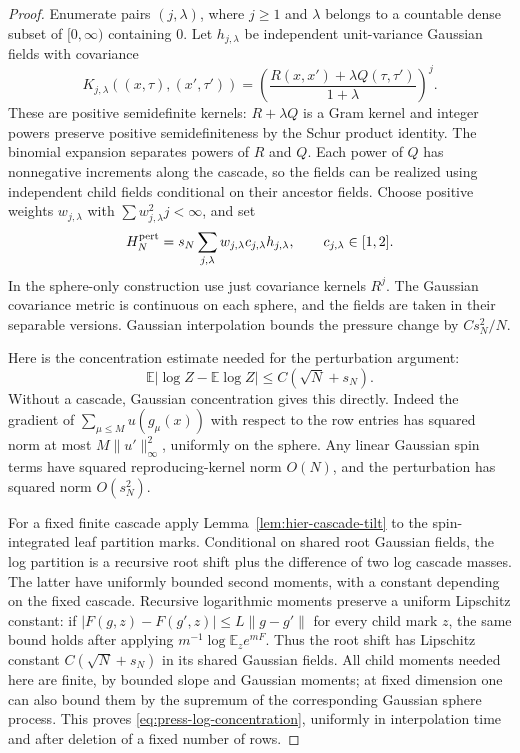 \documentclass[11pt,a4paper]{article}
\numberwithin{equation}{section}
\theoremstyle{definition}
\theoremstyle{remark}
\newcommand{\E}{\mathbb E}
\begin{document}
\begin{proof}
Enumerate pairs $(j,\lambda)$, where $j\ge1$ and $\lambda$ belongs to a
countable dense subset of $[0,\infty)$ containing $0$. Let $h_{j,\lambda}$
be independent unit-variance Gaussian fields with covariance
\[
 K_{j,\lambda}((x,\tau),(x',\tau'))
 =\left(\frac{R(x,x')+\lambda Q(\tau,\tau')}{1+\lambda}\right)^j.
\]
These are positive semidefinite kernels: $R+\lambda Q$ is a Gram kernel and
integer powers preserve positive semidefiniteness by the Schur product
identity. The binomial expansion separates powers of $R$ and $Q$. Each power
of $Q$ has nonnegative increments along the cascade, so the fields can be
realized using independent child fields conditional on their ancestor fields.
Choose positive weights $w_{j,\lambda}$ with
$\sum w_{j,\lambda}^2j<\infty$, and set
\[
 H_N^{\rm pert}=s_N\sum_{j,\lambda}
       w_{j,\lambda}c_{j,\lambda}h_{j,\lambda},
 \qquad c_{j,\lambda}\in[1,2].
\]
In the sphere-only construction use just covariance kernels $R^j$.
The Gaussian covariance metric is continuous on each sphere, and the fields
are taken in their separable versions. Gaussian interpolation bounds the
pressure change by $Cs_N^2/N$.

Here is the concentration estimate needed for the perturbation argument:
\begin{equation}\label{eq:press-log-concentration}
 \E|\log Z-\E\log Z|\le C(\sqrt N+s_N).
\end{equation}
Without a cascade, Gaussian concentration gives this directly. Indeed the
gradient of $\sum_{\mu\le M}u(g_\mu(x))$ with respect to the row entries has
squared norm at most $M\|u'\|_\infty^2$, uniformly on the sphere. Any linear
Gaussian spin terms have squared reproducing-kernel norm $O(N)$, and the
perturbation has squared norm $O(s_N^2)$.

For a fixed finite cascade apply Lemma~\ref{lem:hier-cascade-tilt} to the
spin-integrated leaf partition marks. Conditional on shared root Gaussian
fields, the log partition is a recursive root shift plus the difference of
two log cascade masses. The latter have uniformly bounded second moments,
with a constant depending on the fixed cascade. Recursive logarithmic
moments preserve a uniform Lipschitz constant: if $|F(g,z)-F(g',z)|\le L\|g-g'\|$
for every child mark $z$, the same bound holds after applying
$m^{-1}\log\E_z e^{mF}$. Thus the root shift has Lipschitz constant
$C(\sqrt N+s_N)$ in its shared Gaussian fields. All child moments needed
here are finite, by bounded slope and Gaussian moments; at fixed dimension
one can also bound them by the supremum of the corresponding Gaussian
sphere process. This proves \eqref{eq:press-log-concentration}, uniformly in
interpolation time and after deletion of a fixed number of rows.


\end{proof}
\end{document}
